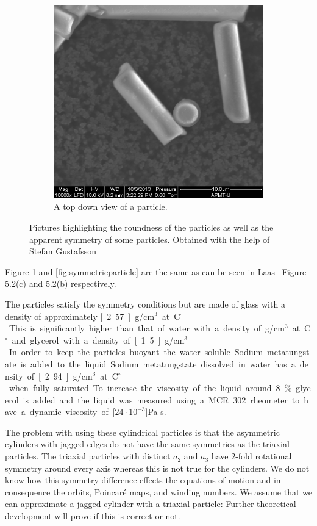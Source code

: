 \begin{figure}[H]
\begin{subfigure}[3b]{0.40\textwidth}
\includegraphics[width=\textwidth]{figures/method/round.png}
\caption{A top down view of a particle.}\label{fig:roundparticle}
\end{subfigure}
\caption{Pictures highlighting the roundness of the particles as well as the apparent symmetry of some particles. Obtained with the help of Stefan Gustafsson}
\label{fig:particlepictures2}
\end{figure}

\noindent Figure \ref{fig:roundparticle} and \ref{fig:symmetricparticle} are the same as can be seen in Laas~\cite{alexanderThesis} Figure 5.2(c) and 5.2(b) respectively. 

The particles satisfy the symmetry conditions but are made of glass with a density of approximately 
\unit[2.57]{g/cm$^3$} at \unit[20]{C$^\circ$}. This is significantly higher than that of water with a density of 
\unit[1]{g/cm$^3$} at \unit[20]{C$^\circ$} and glycerol with a density of \unit[1.5]{g/cm$^3$}. In order to keep the particles buoyant the water soluble Sodium metatungstate is added to the liquid. Sodium metatungstate dissolved in water has a density of \unit[2.94]{g/cm$^3$} at \unit[20]{C$^\circ$} when fully saturated. To increase the viscosity of the liquid around 8\% glycerol is added and the liquid was measured using a MCR 302 rheometer to have a dynamic viscosity of \unit[$24\cdot 10^{-3}$]{Pa s}.

The problem with using these cylindrical particles is that the asymmetric cylinders with jagged edges do not have the same symmetries as the triaxial particles. The triaxial particles with distinct $a_2$ and $a_3$ have $2$-fold rotational symmetry around every axis whereas this is not true for the cylinders. We do not know how this symmetry difference effects the equations of motion and in consequence the orbits, Poincaré maps, and winding numbers. We assume that we can approximate a jagged cylinder with a triaxial particle: Further theoretical development will prove if this is correct or not.
